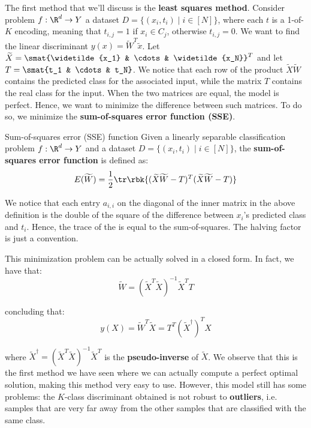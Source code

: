\documentclass[a4paper, 12pt]{report}
\begin{document}
    The first method that we'll discuss is the \textbf{least squares method}. Consider problem $f : \R^d \to Y$ a dataset $D = \{(x_i, t_i) \mid i \in [N]\}$, where each $t$ is a 1-of-$K$ encoding, meaning that $t_{i,j} = 1$ if $x_i \in C_j$, otherwise $t_{i,j} = 0$. We want to find the linear discriminant $y(x) = \widetilde{W}^T\widetilde{x}$. Let $\widetilde{X} = \smat{\widetilde{x_1} & \cdots & \widetilde{x_N}}^T$ and let $T = \smat{t_1 & \cdots & t_N}$. We notice that each row of the product $\widetilde{X} \widetilde{W}$ contains the predicted class for the associated input, while the matrix $T$ contains the real class for the input. When the two matrices are equal, the model is perfect. Hence, we want to minimize the difference between such matrices. To do so, we minimize the \textbf{sum-of-squares error function (SSE)}.

    \begin{frameddefn}{Sum-of-squares error (SSE) function}
        Given a linearly separable classification problem $f : \R^d \to Y$ and a dataset $D =  \{(x_i, t_i) \mid i \in [N]\}$, the \textbf{sum-of-squares error function} is defined as:
        \[E(\widetilde{W}) = \frac{1}{2} \tr \rbk{(\widetilde{X}\widetilde{W} - T)^T(\widetilde{X}\widetilde{W} - T)}\]
    \end{frameddefn}

    We notice that each entry $a_{i,i}$ on the diagonal of the inner matrix in the above definition is the double of the square of the difference between $x_i$'s predicted class and $t_i$. Hence, the trace of the is equal to the sum-of-squares. The halving factor is just a convention.  

    This minimization problem can be actually solved in a closed form. In fact, we have that:
    \[\widetilde{W} = (\widetilde{X}^T \widetilde{X})^{-1} \widetilde{X}^T T\]

    concluding that:
    \[y(X) = \widetilde{W}^T \widetilde{X} = T^T (\widetilde{X}^{\dagger})^T X\]

    where $\widetilde{X}^{\dagger} = (\widetilde{X}^T \widetilde{X})^{-1} \widetilde{X}^T$ is the \textbf{pseudo-inverse} of $\widetilde{X}$. We observe that this is the first method we have seen where we can actually compute a perfect optimal solution, making this method very easy to use. However, this model still has some problems: the $K$-class discriminant obtained is not robust to \textbf{outliers}, i.e. samples that are very far away from the other samples that are classified with the same class.
\end{document}
